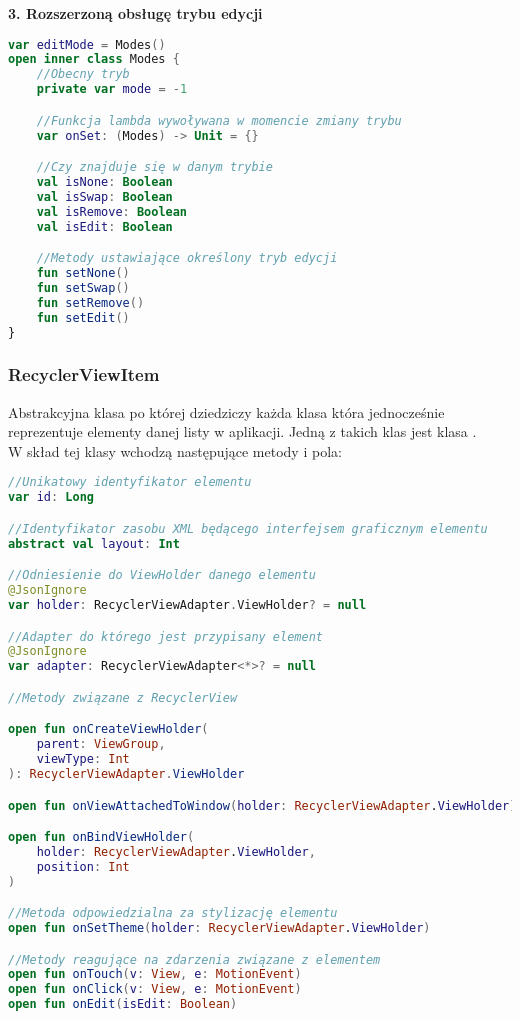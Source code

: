 \vspace{1em}

\textbf{3. Rozszerzoną obsługę trybu edycji}

\begin{lstlisting}[language=Kotlin]
var editMode = Modes()
open inner class Modes {
    //Obecny tryb
    private var mode = -1

    //Funkcja lambda wywoływana w momencie zmiany trybu
    var onSet: (Modes) -> Unit = {}

    //Czy znajduje się w danym trybie
    val isNone: Boolean
    val isSwap: Boolean
    val isRemove: Boolean
    val isEdit: Boolean

    //Metody ustawiające określony tryb edycji
    fun setNone()
    fun setSwap()
    fun setRemove()
    fun setEdit()
}
\end{lstlisting}

\newpage

\subsubsection{RecyclerViewItem}
Abstrakcyjna klasa po której dziedziczy każda klasa która jednocześnie reprezentuje elementy danej listy w aplikacji. Jedną z takich klas jest klasa .\\

W skład tej klasy wchodzą następujące metody i pola:
\begin{lstlisting}[language=Kotlin]
//Unikatowy identyfikator elementu
var id: Long

//Identyfikator zasobu XML będącego interfejsem graficznym elementu
abstract val layout: Int

//Odniesienie do ViewHolder danego elementu
@JsonIgnore
var holder: RecyclerViewAdapter.ViewHolder? = null

//Adapter do którego jest przypisany element
@JsonIgnore
var adapter: RecyclerViewAdapter<*>? = null

//Metody związane z RecyclerView

open fun onCreateViewHolder(
    parent: ViewGroup,
    viewType: Int
): RecyclerViewAdapter.ViewHolder

open fun onViewAttachedToWindow(holder: RecyclerViewAdapter.ViewHolder)

open fun onBindViewHolder(
    holder: RecyclerViewAdapter.ViewHolder,
    position: Int
)

//Metoda odpowiedzialna za stylizację elementu
open fun onSetTheme(holder: RecyclerViewAdapter.ViewHolder)

//Metody reagujące na zdarzenia związane z elementem
open fun onTouch(v: View, e: MotionEvent)
open fun onClick(v: View, e: MotionEvent)
open fun onEdit(isEdit: Boolean)
\end{lstlisting}

